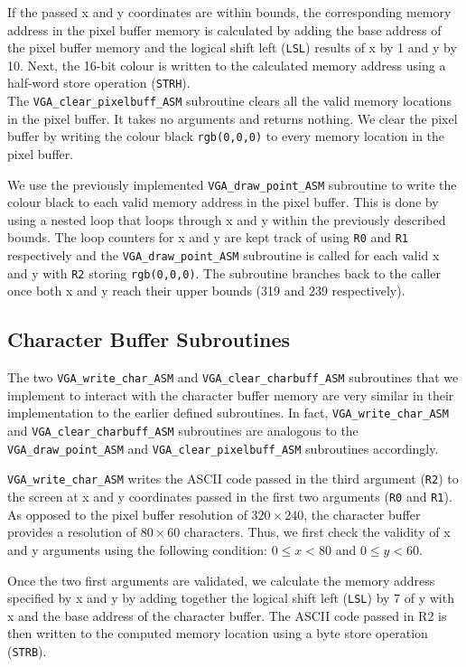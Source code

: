 \documentclass[11pt]{article}
\begin{document}
If the passed x and y coordinates are within bounds, the corresponding memory address in the pixel buffer memory is calculated by adding the base address of the pixel buffer memory and the logical shift left (\verb+LSL+) results of x by 1 and y by 10. Next, the 16-bit colour is written to the calculated memory address using a half-word store operation (\verb+STRH+).\\

The \verb+VGA_clear_pixelbuff_ASM+ subroutine clears all the valid memory locations in the pixel buffer. It takes no arguments and returns nothing. We clear the pixel buffer by writing the colour black \verb+rgb(0,0,0)+ to every memory location in the pixel buffer.

We use the previously implemented \verb+VGA_draw_point_ASM+ subroutine to write the colour black to each valid memory address in the pixel buffer. This is done by using a nested loop that loops through x and y within the previously described bounds. The loop counters for x and y are kept track of using \verb+R0+ and \verb+R1+ respectively and the \verb+VGA_draw_point_ASM+ subroutine is called for each valid x and y with \verb+R2+ storing \verb+rgb(0,0,0)+. The subroutine branches back to the caller once both x and y reach their upper bounds (319 and 239 respectively).
\subsection{Character Buffer Subroutines}
The two \verb+VGA_write_char_ASM+ and \verb+VGA_clear_charbuff_ASM+ subroutines that we implement to interact with the character buffer memory are very similar in their implementation to the earlier defined subroutines. In fact, \verb+VGA_write_char_ASM+ and \verb+VGA_clear_charbuff_ASM+ subroutines are analogous to the \verb+VGA_draw_point_ASM+ and \verb+VGA_clear_pixelbuff_ASM+ subroutines accordingly.

\verb+VGA_write_char_ASM+ writes the ASCII code passed in the third argument (\verb+R2+) to the screen at x and y coordinates passed in the first two arguments (\verb+R0+ and \verb+R1+). As opposed to the pixel buffer resolution of $320 \times 240$, the character buffer provides a resolution of $80 \times 60$ characters. Thus, we first check the validity of x and y arguments using the following condition: $0 \leq x < 80$ and $0\leq y < 60 $.

Once the two first arguments are validated, we calculate the memory address specified by x and y by adding together the logical shift left (\verb+LSL+) by 7 of y with x and the base address of the character buffer. The ASCII code passed in R2 is then written to the computed memory location using a byte store operation (\verb+STRB+).
\end{document}
